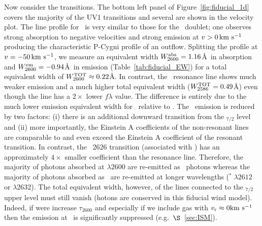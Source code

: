 \documentclass[12pt,preprint]{aastex}
\begin{document}
Now consider the  transitions.
The bottom left panel of Figure~\ref{fig:fiducial_1d} covers the
majority of the  UV1 transitions and several are
shown in the velocity plot.  The line
profile for \feiib\ is very similar to those for the \mgiid\ doublet;
one observes strong absorption to negative velocities and strong
emission at $v > 0 \, {\rm km~s^{-1}}$ producing the characteristic P-Cygni profile of
an outflow.  Splitting
the profile at $v = -50 \, {\rm km~s^{-1}}$, we measure an equivalent width
$W_{2600}^{\rm abs} = 1.16$\AA\ in absorption and $W_{2600}^{\rm em} =
-0.94$\AA\ in emission (Table~\ref{tab:fiducial_EW}) for a total
equivalent width of $W_{2600}^{\rm TOT} \approx 0.22$\AA.  
In contrast, the \feiia\ resonance line shows much weaker emission and
a much higher total equivalent width ($W_{2586}^{\rm TOT} = 0.49$\AA)
even though the line has a $2 \times$ lower $f\lambda$ value.
The difference is entirely due to the much lower emission equivalent
width for \feiia\ relative to \feiib.  The \feiia\ emission is reduced
by two factors:
(i) there is an additional downward transition from the
\zconfig$_{7/2}$ level and 
(ii) more importantly, the Einstein A
coefficients of the non-resonant lines are comparable to and even
exceed the Einstein A coefficient of
the resonant transition.  In contrast, 
the ~2626 transition (associated with \feiib)
has an approximately  $4\times$ smaller coefficient than the
resonance line.  Therefore, the majority of photons absorbed at
$\lambda 2600$ are re-emitted as \feiib\ photons whereas 
the majority of photons absorbed as \feiia\ are re-emitted 
at longer wavelengths ($^* \; \lambda 2612$ or $\lambda
2632$).
The total equivalent width, however, of the lines connected to the
\zconfig$_{7/2}$ upper level must still vanish (hotons are conserved
in this fiducial wind model).
Indeed, if were increase $\tau_{2600}$ and especially if we include
gas with $v_{\rm r} \approx 0 {\rm km~s^{-1}}$ then the emission at \feiib\ is
significantly suppressed (e.g.\ $\S$~\ref{sec:ISM}).
\end{document}
